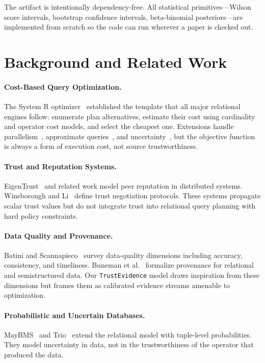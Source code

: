 \documentclass[runningheads]{llncs}
\begin{document}
The artifact is intentionally dependency-free.  All statistical
primitives---Wilson score intervals, bootstrap confidence intervals,
beta-binomial posteriors---are implemented from scratch so the code can
run wherever a paper is checked out.

\section{Background and Related Work}
\label{sec:related}

\paragraph{Cost-Based Query Optimization.}
The System R optimizer~\cite{selinger1979access} established the
template that all major relational engines follow: enumerate plan
alternatives, estimate their cost using cardinality and operator cost
models, and select the cheapest one.  Extensions handle
parallelism~\cite{mohan1992aries}, approximate
queries~\cite{ioannidis1990randomized}, and
uncertainty~\cite{re2007probabilistic}, but the objective function is
always a form of execution cost, not source trustworthiness.

\paragraph{Trust and Reputation Systems.}
EigenTrust~\cite{kamvar2003eigentrust} and related work model peer
reputation in distributed systems.  Winsborough and Li~\cite{winsborough2002trust}
define trust negotiation protocols.  These systems propagate scalar trust
values but do not integrate trust into relational query planning with hard
policy constraints.

\paragraph{Data Quality and Provenance.}
Batini and Scannapieco~\cite{batini2009methodologies} survey data-quality
dimensions including accuracy, consistency, and timeliness.  Buneman
et al.~\cite{buneman2001provenance} formalize provenance for relational
and semistructured data.  Our \texttt{TrustEvidence} model draws
inspiration from these dimensions but frames them as calibrated evidence
streams amenable to optimization.

\paragraph{Probabilistic and Uncertain Databases.}
MayBMS~\cite{antova2008maybms} and Trio~\cite{widom2005trio} extend the
relational model with tuple-level probabilities.  They model uncertainty
in data, not in the trustworthiness of the operator that produced the
data.
\end{document}

